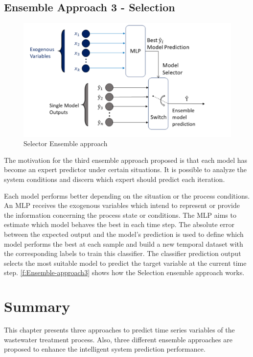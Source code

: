 \subsection{Ensemble Approach 3 - Selection}
\label{s:Ensemble-Approach3}

\begin{figure}[h]
\centering
\includegraphics[width=\linewidth]{figures/Ch4/Ensemble_Approach3.pdf}
\caption{Selector Ensemble approach}
\label{f:Ensemble-approach3}
\end{figure}

The motivation for the third ensemble approach proposed is that each model has become an expert predictor under certain situations. It is possible to analyze the system conditions and discern which expert should predict each iteration. 

Each model performs better depending on the situation or the process conditions. An \ac{MLP} receives the exogenous variables which intend to represent or provide the information concerning the process state or conditions. The \ac{MLP} aims to estimate which model behaves the best in each time step. The absolute error between the expected output and the model's prediction is used to define which model performs the best at each sample and build a new temporal dataset with the corresponding labels to train this classifier. 
The classifier prediction output selects the most suitable model to predict the target variable at the current time step. \autoref{f:Ensemble-approach3} shows how the Selection ensemble approach works.

\section{Summary}

\label{s:Contribution-1-Summary}

This chapter presents three approaches to predict time series variables of the wastewater treatment process. Also, three different ensemble approaches are proposed to enhance the intelligent system prediction performance.